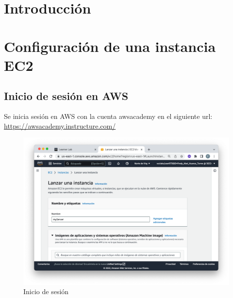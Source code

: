 %
%

\section{Introducción}

\lipsum[2-4]

\section{Configuración de una instancia EC2}
\subsection{Inicio de sesión en AWS}

Se inicia sesión en AWS con la cuenta awsacademy en el siguiente url: \href{https://awsacademy.instructure.com/}{https://awsacademy.instructure.com/}

\begin{figure}[h]
	\centering
	\includegraphics[scale=.3] {img/01}
	\caption{Inicio de sesión}
	\label{fig:0}	
\end{figure} 

\clearpage

